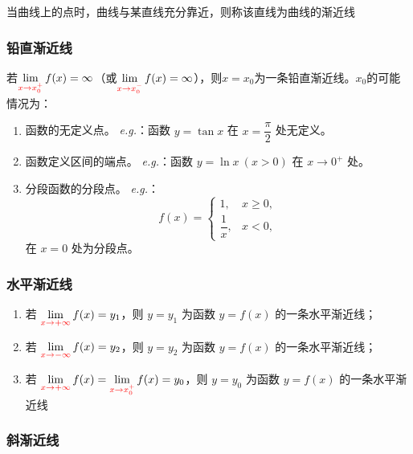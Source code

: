 \documentclass[a4paper,12pt]{article}
\begin{document}
    当曲线上的点{\color{red}{远离原点}}时，曲线与某直线充分靠近，则称该直线为曲线的渐近线

    \subsubsection{铅直渐近线}

    若$\lim\limits_{{\color{red}{x\to x_0^{+}}}} f(x) = \infty$（或$\lim\limits_{{\color{red}{x\to x_0^{-}}}} f(x) = \infty$），则$x=x_0$为一条铅直渐近线。$x_0$的可能情况为：
    \begin{enumerate}
        \item 函数的无定义点。
        \emph{e.g.}：函数 $y=\tan x$ 在 $x=\dfrac{\pi}{2}$ 处无定义。

        \item 函数定义区间的端点。
        \emph{e.g.}：函数 $y=\ln x\ (x>0)$ 在 $x\to 0^+$ 处。

        \item 分段函数的分段点。
        \emph{e.g.}：
        \[
            f(x)=
            \begin{cases}
                1, & x \ge 0,\\[4pt]
                \dfrac{1}{x}, & x < 0,
            \end{cases}
        \]
        在 $x=0$ 处为分段点。
    \end{enumerate}

    \subsubsection{水平渐近线}

    \begin{enumerate}
        \item 若 $\lim\limits_{\color{red}{x\to +\infty}} f(x)=y_1$，则 $y=y_1$ 为函数 $y=f(x)$ 的一条水平渐近线；
        \item 若 $\lim\limits_{\color{red}{x\to -\infty}} f(x)=y_2$，则 $y=y_2$ 为函数 $y=f(x)$ 的一条水平渐近线；
        \item 若 $\lim\limits_{\color{red}{x\to +\infty}} f(x) = \lim\limits_{{\color{red}{x\to x_0^{+}}}} f(x) = y_0$，则 $y=y_0$ 为函数 $y=f(x)$ 的一条水平渐近线
    \end{enumerate}

    \subsubsection{斜渐近线}
\end{document}

